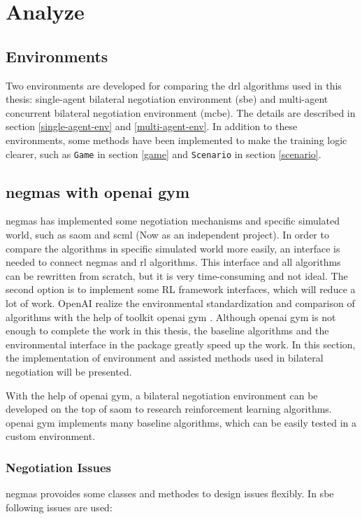\chapter{Analyze}

\section{Environments}
Two environments are developed for comparing the \gls{drl} algorithms used in this thesis: single-agent bilateral negotiation environment (\gls{sbe}) and multi-agent concurrent bilateral negotiation environment (\gls{mcbe}). The details are described in section \ref{single-agent-env} and \ref{multi-agent-env}. In addition to these environments, some methods have been implemented to make the training logic clearer, such as \texttt{Game} in section \ref{game} and \texttt{Scenario} in section \ref{scenario}.

\section{\gls{negmas} with \gls{openai gym}}
\gls{negmas} has implemented some negotiation mechanisms and specific simulated world, such as \gls{saom} and \gls{scml} (Now as an independent project). In order to compare the algorithms in specific simulated world more easily, an interface is needed to connect \gls{negmas} and \gls{rl} algorithms. This interface and all algorithms can be rewritten from scratch, but it is very time-consuming and not ideal. The second option is to implement some RL framework interfaces, which will reduce a lot of work. OpenAI realize the environmental standardization and comparison of algorithms with the help of toolkit \gls{openai gym} \parencite{brockman2016openai}. Although \gls{openai gym} is not enough to complete the work in this thesis, the baseline algorithms and the environmental interface in the package greatly speed up the work. In this section, the implementation of environment and assisted methods used in bilateral negotiation will be presented.

With the help of \gls{openai gym},  a bilateral negotiation environment can be developed on the top of \gls{saom} to research reinforcement learning algorithms. \gls{openai gym} implements many baseline algorithms, which can be easily tested in a custom environment.

\subsection{Negotiation Issues}
\gls{negmas} provoides some classes and methodes to design issues flexibly. In \gls{sbe} following issues are used:
 
